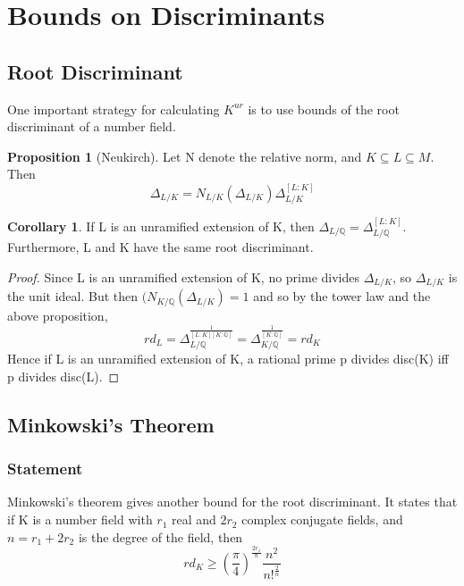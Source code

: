 \documentclass[12pt]{extarticle}
\newcommand{\<}{\langle}
\renewcommand{\>}{\rangle}
\theoremstyle{definition}
\newtheorem{corollary}{Corollary}
\newtheorem{proposition}{Proposition}
\begin{document}
\section{Bounds on Discriminants}
\subsection{Root Discriminant}
One important strategy for calculating $K^{ur}$ is to use bounds of the root discriminant of a number field. 
\begin{proposition}[Neukirch]
Let N denote the relative norm, and $K\subseteq L \subseteq M $. Then \begin{equation}
    \Delta_{L/K} = N_{L/K}(\Delta_{L/K})\Delta_{L/K}^{[L:K]}
\end{equation}
\end{proposition}
\begin{corollary}
 If L is an unramified extension of K, then $\Delta_{L/\mathbb{Q}}= \Delta_{L/\mathbb{Q}}^{[L:K]}$. Furthermore, L and K have the same root discriminant.
\end{corollary}
\begin{proof}
Since L is an unramified extension of K, no prime divides $\Delta_{L/K}$, so $\Delta_{L/K}$ is the unit ideal. But then $(N_{K/\mathbb{Q}}(\Delta_{L/K})=1$ and so by the tower law and the above proposition, \begin{equation}
    rd_L=\Delta_{L/\mathbb{Q}}^\frac{1}{[L:K][K:\mathbb{Q}]}=\Delta_{K/\mathbb{Q}}^\frac{1}{[K:\mathbb{Q}]}= rd_K
\end{equation}
Hence if L is an unramified extension of K, a rational prime p divides disc(K) iff p divides disc(L).
\end{proof}
\subsection{Minkowski's Theorem}
\subsubsection*{Statement}
Minkowski's theorem gives another bound for the root discriminant. It states that if K is a number field with $r_1$ real and $2r_2$ complex conjugate fields, and $n=r_1+2r_2$ is the degree of the field, then 
\begin{equation}
rd_K\geqslant (\frac{\pi}{4})^{\frac{2r_1}{n}}\frac{n^2}{n!^{\frac{2}{n}}}
\end{equation} 
\end{document}
